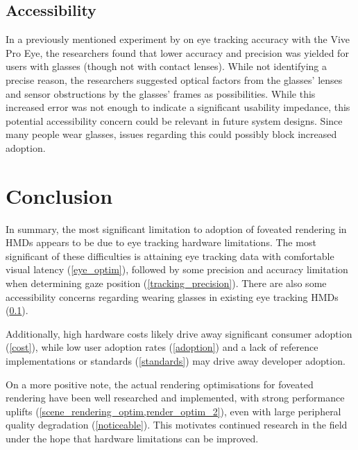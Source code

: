 \documentclass[a4paper,11pt]{article}
\begin{document}
\subsection{Accessibility}
\label{access}
In a previously mentioned experiment by \textcite{schuetz2022eye} on eye tracking accuracy with the Vive Pro Eye, the researchers found that lower accuracy and precision was yielded for users with glasses (though not with contact lenses). While not identifying a precise reason, the researchers suggested optical factors from the glasses' lenses and sensor obstructions by the glasses' frames as possibilities. While this increased error was not enough to indicate a significant usability impedance, this potential accessibility concern could be relevant in future system designs. Since many people wear glasses, issues regarding this could possibly block increased adoption.

\section{Conclusion}
In summary, the most significant limitation to adoption of foveated rendering in HMDs appears to be due to eye tracking hardware limitations. The most significant of these difficulties is attaining eye tracking data with comfortable visual latency (\cref{eye_optim}), followed by some precision and accuracy limitation when determining gaze position (\cref{tracking_precision}). There are also some accessibility concerns regarding wearing glasses in existing eye tracking HMDs (\cref{access}).

Additionally, high hardware costs likely drive away significant consumer adoption (\cref{cost}), while low user adoption rates (\cref{adoption}) and a lack of reference implementations or standards (\cref{standards}) may drive away developer adoption.

On a more positive note, the actual rendering optimisations for foveated rendering have been well researched and implemented, with strong performance uplifts (\cref{scene_rendering_optim,render_optim_2}), even with large peripheral quality degradation (\cref{noticeable}). This motivates continued research in the field under the hope that hardware limitations can be improved.

\printbibliography
\end{document}
